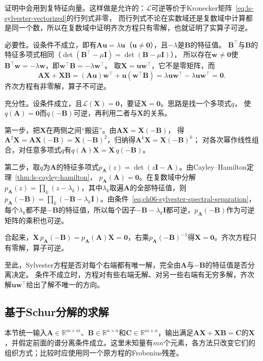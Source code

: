 证明中会用到复特征向量。这样做是允许的：$\mathcal L$可逆等价于Kronecker矩阵~\eqref{eq:ls-sylvester-vectorized}的行列式非零，
而行列式不论在实数域还是复数域中计算都是同一个数，所以在复数域中证明齐次方程只有零解，也就证明了实算子可逆。

必要性。设条件不成立，即有$\bm A\bm u=\lambda\bm u$（$\bm u\neq\bm0$），且$-\lambda$是$\bm B$的特征值。
$\bm B^\top$与$\bm B$的特征多项式相同（$\det(\bm B^\top-\mu\bm I)=\det(\bm B-\mu\bm I)$），
所以存在$\bm w\neq\bm0$使$\bm B^\top\bm w=-\lambda\bm w$，即$\bm w^\top\bm B=-\lambda\bm w^\top$。
取$\bm X=\bm u\bm w^\top$，它不是零矩阵，而
\[
 \bm A\bm X+\bm X\bm B=(\bm A\bm u)\bm w^\top+\bm u(\bm w^\top\bm B)
 =\lambda\bm u\bm w^\top-\lambda\bm u\bm w^\top=\bm0 .
\]
齐次方程有非零解，算子不可逆。

充分性。设条件成立，且$\mathcal L(\bm X)=\bm0$，要证$\bm X=\bm0$。思路是找一个多项式$q$，
使$q(\bm A)=\bm0$而$q(-\bm B)$可逆，再利用二者与$\bm X$的关系。

第一步，把$\bm X$在两侧之间“搬运”。由$\bm A\bm X=\bm X(-\bm B)$，
得$\bm A^2\bm X=\bm A\bm X(-\bm B)=\bm X(-\bm B)^2$，归纳得$\bm A^k\bm X=\bm X(-\bm B)^k$；
对各次幂作线性组合，对任意多项式$q$有$q(\bm A)\bm X=\bm X\,q(-\bm B)$。

第二步，取$q$为$\bm A$的特征多项式$p_{\bm A}(z)=\det(z\bm I-\bm A)$。由Cayley--Hamilton定理~\ref{thm:ls-cayley-hamilton}，
$p_{\bm A}(\bm A)=\bm0$。在复数域中分解$p_{\bm A}(z)=\prod_k(z-\lambda_k)$，其中$\lambda_k$取遍$\bm A$的全部特征值，则
$p_{\bm A}(-\bm B)=\prod_k(-\bm B-\lambda_k\bm I)$。由条件~\eqref{eq:ch06-sylvester-spectral-separation}，
每个$\lambda_k$都不是$-\bm B$的特征值，所以每个因子$-\bm B-\lambda_k\bm I$都可逆，$p_{\bm A}(-\bm B)$作为可逆矩阵的乘积也可逆。

合起来，$\bm X\,p_{\bm A}(-\bm B)=p_{\bm A}(\bm A)\bm X=\bm0$，右乘$p_{\bm A}(-\bm B)^{-1}$得$\bm X=\bm0$。齐次方程只有零解，算子可逆。

至此，Sylvester方程是否对每个右端都有唯一解，完全由$\bm A$与$-\bm B$的特征值是否分离决定。
条件不成立时，方程对有些右端无解、对另一些右端有无穷多解，齐次解$\bm u\bm w^\top$给出了解不唯一的方向。

\subsection{基于Schur分解的求解}
\label{sec:ls-matrix-equation-solve}

本节统一输入$\bm A\in\mathbb R^{m\times m}$、$\bm B\in\mathbb R^{n\times n}$和$\bm C\in\mathbb R^{m\times n}$，输出满足$\bm A\bm X+\bm X\bm B=\bm C$的$\bm X$，并假定前面的谱分离条件成立。这里未知量有$mn$个元素，各方法只改变它们的组织方式；比较时应使用同一个原方程的Frobenius残差。

